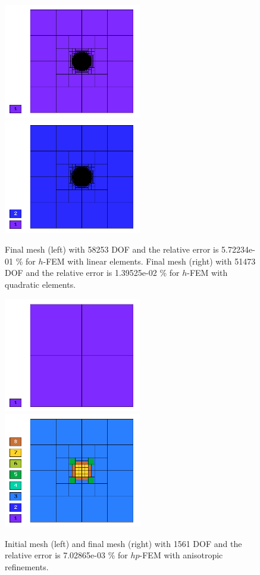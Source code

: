 \documentclass[12pt]{elsarticle}
\begin{document}
\begin{figure}[H]
\centering
\includegraphics[height=5cm]{nist/nist-4/mesh_h1_aniso.png}
\includegraphics[height=5cm]{nist/nist-4/mesh_h2_aniso.png}
\caption{
Final mesh (left) with 58253 DOF and the relative error is 5.72234e-01 \% for $h$-FEM with linear elements.
Final mesh (right) with 51473 DOF and the relative error is 1.39525e-02 \% for $h$-FEM with quadratic elements.}
\label{fig:nist-4-h-aniso}
\end{figure}

\begin{figure}[H]
\centering
\includegraphics[height=5cm]{nist/nist-4/mesh_hp_aniso_init.png}\ \
\includegraphics[height=5cm]{nist/nist-4/mesh_hp_aniso.png}
\caption{Initial mesh (left) and final mesh (right) with 1561 DOF and the
relative error is 7.02865e-03 \% for $hp$-FEM with anisotropic refinements.}
\label{fig:nist-4-hp-aniso}
\end{figure}
\end{document}
